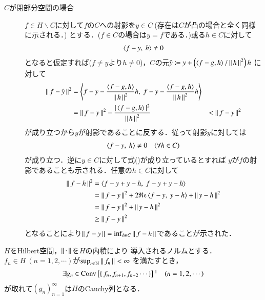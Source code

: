 \begin{prf}
\begin{description}
	\item[$C$が閉部分空間の場合]
		$f \in H \backslash C$に対して$f$の$C$への射影を$y \in C\ $(存在は$C$が凸の場合と全く同様に示される．)
		とする．($f \in C$の場合は$y = f$である．)或る$h \in C$に対して
		\begin{align}
			\inprod<f -y,\ h> \neq 0
		\end{align}
		となると仮定すれば($f \neq y$より$h \neq 0$)，$C$の元$\hat{y} \coloneqq y + \left(\inprod<f - g,h>/\Norm{h}{}^2\right)h$
		に対して
		\begin{align}
			\Norm{f - \hat{y}}{}^2 
			&= \inprod<f - y - \frac{\inprod<f - g,h>}{\Norm{h}{}^2}h,\ f - y - \frac{\inprod<f - g,h>}{\Norm{h}{}^2}h> \\
			&= \Norm{f-y}{}^2 - \frac{|\inprod<f - g,h>|^2}{\Norm{h}{}^2}
			&< \Norm{f-y}{}^2
		\end{align}
		が成り立つから$y$が射影であることに反する．従って射影$y$に対しては
		\begin{align}
			\inprod<f -y,\ h> \neq 0 \quad (\forall h \in C) \label{eq:projection}
		\end{align}
		が成り立つ．逆に$y \in C$に対して式()が成り立っているとすれば
		$y$が$f$の射影であることも示される．任意の$h \in C$に対して
		\begin{align}
			\Norm{f - h}{}^2 &= \inprod<f - y + y - h,\ f - y + y - h> \\
			&= \Norm{f - y}{}^2 + 2 \Re{\inprod<f - y,\ y - h>} + \Norm{y - h}{}^2 \\
			&= \Norm{f - y}{}^2 + \Norm{y - h}{}^2 \\
			&\geq \Norm{f - y}{}^2
		\end{align}
		となることにより$\left\|\, f - y\, \right\|_{} = \operatorname*{inf}_{h \in C} \left\|\, f - h\, \right\|_{}$であることが示された．
	\end{description}
\end{prf}

\begin{itembox}[l]{}
	\begin{thm}[Kolmosの補題]
		$H$をHilbert空間，$\left\|\, \cdot\, \right\|_{}$を$H$の内積により
		導入されるノルムとする．$f_n \in H\ (n=1,2,\cdots)$が$\operatorname*{sup}_{n \in \mathbb{N}} \left\|\, f_n\, \right\|_{} < \infty$
		を満たすとき，
		\begin{align}
			\exists g_n \in \Conv{f_n,f_{n+1},f_{n+2} \cdots}\footnotemark \quad (n=1,2,\cdots)
		\end{align}
		が取れて$(g_n)_{n=1}^{\infty}$は$H$のCauchy列となる．
	\end{thm}
\end{itembox}

